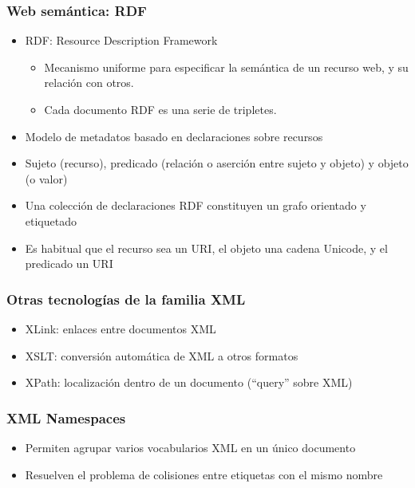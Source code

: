 \begin{frame}[fragile]
\frametitle{Web semántica: RDF}

\begin{itemize}
\item RDF: Resource Description Framework
  \begin{itemize}
  \item Mecanismo uniforme para especificar la semántica de un recurso
    web, y su relación con otros.
  \item Cada documento RDF es una serie de tripletes.
  \end{itemize}
\item Modelo de metadatos basado en declaraciones sobre recursos
\item Sujeto (recurso), predicado (relación o aserción entre sujeto y
  objeto) y objeto (o valor)
\item Una colección de declaraciones RDF constituyen un grafo
  orientado y etiquetado
\item Es habitual que el recurso sea un URI, el objeto una cadena
  Unicode, y el predicado un URI
\end{itemize}

\end{frame}


\begin{frame}
\frametitle{Otras tecnologías de la familia XML}

\begin{itemize}
\item XLink: enlaces entre documentos XML
\item XSLT: conversión automática de XML a otros formatos
\item XPath: localización dentro de un documento (``query'' sobre XML)

\end{itemize}
\end{frame}


\begin{frame}
\frametitle{XML Namespaces}

\begin{itemize}
\item Permiten agrupar varios vocabularios XML en un único documento
\item Resuelven el problema de colisiones entre etiquetas con el mismo nombre
\end{itemize}

\end{frame}

